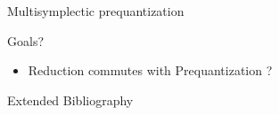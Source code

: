 \documentclass[handout,10pt]{beamer}
\begin{document}



\begin{frame}{Multisymplectic prequantization}


	\vfill
	\begin{probox}[colbacktitle=yellow!15!white ,colback=yellow!15!white]{ Goals?}
		\begin{itemize}
			\item[\smark] Reduction commutes with Prequantization ?
		\end{itemize}
	\end{probox}	

\end{frame}






\begin{frame}[t,allowframebreaks]{Extended Bibliography}
	
	
\end{frame}




\end{document}
